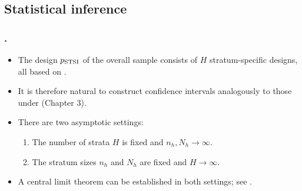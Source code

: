 \documentclass{my_eth_beamer}
\numberwithin{equation}{section}
\begin{document}
\subsection{Statistical inference}

\begin{frame}
    \frametitle{\insertsectionnumber.\insertsubsectionnumber~\insertsubsection}
    \begin{itemize}
    \setlength{\itemsep}{10pt}
        \item The design $p_{\mathrm{STSI}}$ of the overall sample consists of $H$
            stratum-specific designs, \alert{all based on \SRS}.
        \item It is therefore natural to construct \alert{confidence intervals}
            \alert{analogously} to those under \SRS (Chapter 3).
        \item There are \alert{two asymptotic settings}:
            \vspace{0.25em}
            \begin{enumerate}
            \setlength{\itemsep}{6pt}
                \item The number of strata $H$ is fixed and $n_h,N_h
                    \rightarrow \infty$.
                \item The stratum sizes $n_h$ and $N_h$ are fixed and $H
                    \rightarrow \infty$.
            \end{enumerate}
        \item A \alert{central limit theorem} can be established in both
            settings; see \citet{krewski_rao_1981}.
    \end{itemize}
\end{frame}
\end{document}
